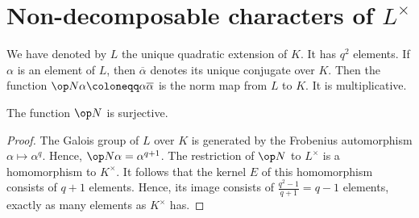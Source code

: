 \documentclass[../main.tex]{subfiles}
\begin{document}
\section{Non-decomposable characters of \texorpdfstring{$L^\times$}{ L*}}
We have denoted by $L$ the unique quadratic extension of $K$. It has $q^2$ elements. If $\alpha$ is an element of $L$, then $\overline\alpha$ denotes its unique conjugate over $K$. Then the function $\op N\alpha\coloneqq\alpha\overline\alpha$ is the norm map from $L$ to $K$. It is multiplicative.
\begin{lemma} \label{lem:n-epi}
	The function $\op N$ is surjective.
\end{lemma}
\begin{proof}
	The Galois group of $L$ over $K$ is generated by the Frobenius automorphism $\alpha\mapsto\alpha^q$. Hence, $\op N\alpha=\alpha^{q+1}$. The restriction of $\op N$ to $L^\times$ is a homomorphism to $K^\times$. It follows that the kernel $E$ of this homomorphism consists of $q+1$ elements. Hence, its image consists of $\frac{q^2-1}{q+1}=q-1$ elements, exactly as many elements as $K^\times$ has.
\end{proof}
\end{document}
